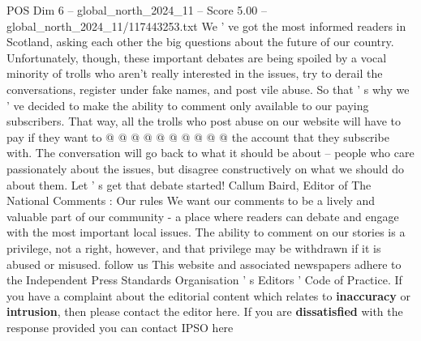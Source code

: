 \begin{textsample}{POS Dim 6 – global\_north\_2024\_11 – Score 5.00 – global\_north\_2024\_11/117443253.txt}
We ' ve got the most informed readers in Scotland, asking each other the big questions about the future of our country.
Unfortunately, though, these important debates are being spoiled by a vocal minority of trolls who aren't really interested in the issues, try to derail the conversations, register under fake names, and post vile abuse.
So that ' s why we ' ve decided to make the ability to comment only available to our paying subscribers.
That way, all the trolls who post abuse on our website will have to pay if they want to @ @ @ @ @ @ @ @ @ @ the account that they subscribe with.
The conversation will go back to what it should be about -- people who care passionately about the issues, but disagree constructively on what we should do about them.
Let ' s get that debate started!
Callum Baird, Editor of The National Comments : Our rules We want our comments to be a lively and valuable part of our community - a place where readers can debate and engage with the most important local issues.
The ability to comment on our stories is a privilege, not a right, however, and that privilege may be withdrawn if it is abused or misused. follow us This website and associated newspapers adhere to the Independent Press Standards Organisation ' s Editors ' Code of Practice.
If you have a complaint about the editorial content which relates to \textbf{inaccuracy} or \textbf{intrusion}, then please contact the editor here.
If you are \textbf{dissatisfied} with the response provided you can contact IPSO here

\end{textsample}

